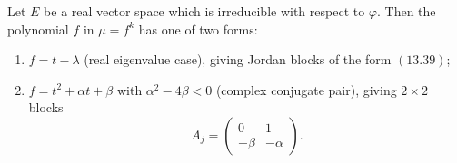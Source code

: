 Let $E$ be a real vector space which is irreducible with respect to $\varphi$. Then the polynomial $f$ in $\mu = f^k$ has one of two forms:
\begin{enumerate}
  \item $f = t - \lambda$ (real eigenvalue case), giving Jordan blocks of the form $(13.39)$;
  \item $f = t^2 + \alpha t + \beta$ with $\alpha^2 - 4\beta < 0$ (complex conjugate pair), giving $2 \times 2$ blocks
  $$A_j = \begin{pmatrix} 0 & 1 \\ -\beta & -\alpha \end{pmatrix}.$$
\end{enumerate}
